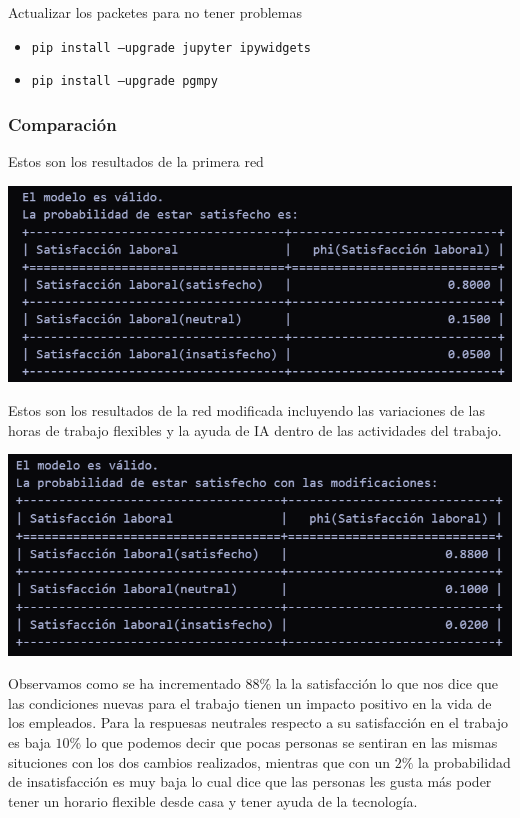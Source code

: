 Actualizar los packetes para no tener problemas 
\begin{itemize}
    \item \texttt{pip install --upgrade jupyter ipywidgets}
    \item \texttt{pip install --upgrade pgmpy}
\end{itemize}


\subsubsection*{Comparación}

Estos son los resultados de la primera red 
\begin{center}
    \includegraphics[scale = .6]{IMA/ejecucionRedBayesina.png}
\end{center}

Estos son los resultados de la red modificada incluyendo las variaciones de las horas de 
trabajo flexibles y la ayuda de IA dentro de las actividades del trabajo. 

\begin{center}
    \includegraphics[scale = .6]{IMA/ejecucionRedModificada.png}
\end{center}

Observamos como se ha incrementado $88\%$ la la satisfacción lo que nos dice que las condiciones 
nuevas para el trabajo tienen un impacto positivo en la vida de los empleados. Para la 
respuesas neutrales respecto a su satisfacción en el trabajo es baja $10\%$  lo que podemos 
decir que pocas personas se sentiran en las mismas situciones con los dos cambios realizados, 
mientras que con un $2\%$ la probabilidad de insatisfacción es muy baja lo cual dice que las 
personas les gusta más poder tener un horario flexible desde casa y tener ayuda de la 
tecnología.

